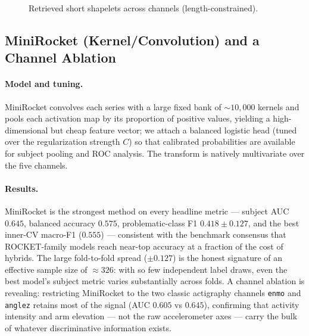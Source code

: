 \begin{figure}[h]
    \centering
    \caption{Retrieved short shapelets across channels (length-constrained).}
    \label{fig:ts_shapelets}
\end{figure}

\subsection{MiniRocket (Kernel/Convolution) and a Channel Ablation}
\paragraph{Model and tuning.} MiniRocket convolves each series with a large fixed bank of $\sim 10{,}000$ kernels and pools each activation map by its proportion of positive values, yielding a high-dimensional but cheap feature vector; we attach a balanced logistic head (tuned over the regularization strength $C$) so that calibrated probabilities are available for subject pooling and ROC analysis. The transform is natively multivariate over the five channels.

\paragraph{Results.} MiniRocket is the strongest method on every headline metric --- subject AUC $0.645$, balanced accuracy $0.575$, problematic-class F1 $0.418\pm0.127$, and the best inner-CV macro-F1 ($0.555$) --- consistent with the benchmark consensus that ROCKET-family models reach near-top accuracy at a fraction of the cost of hybrids. The large fold-to-fold spread ($\pm 0.127$) is the honest signature of an effective sample size of $\approx 326$: with so few independent label draws, even the best model's subject metric varies substantially across folds. A channel ablation is revealing: restricting MiniRocket to the two classic actigraphy channels \texttt{enmo} and \texttt{anglez} retains most of the signal (AUC $0.605$ vs $0.645$), confirming that activity intensity and arm elevation --- not the raw accelerometer axes --- carry the bulk of whatever discriminative information exists.

